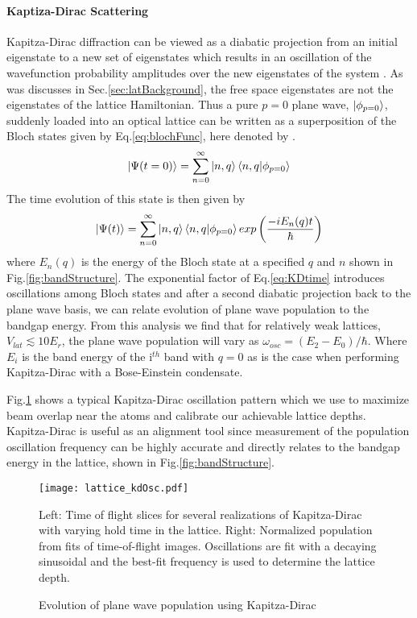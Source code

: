 \paragraph{Kaptiza-Dirac Scattering}
Kapitza-Dirac diffraction can be viewed as a diabatic projection from an initial eigenstate to a new set of eigenstates which results in an oscillation of the wavefunction probability amplitudes over the new eigenstates of the system \cite{Denschlag2002}.
As was discusses in Sec.\;\ref{sec:latBackground}, the free space eigenstates are not the eigenstates of the lattice Hamiltonian. 
Thus a pure $p=0$ plane wave, $\left| {\phi_{p=0}} \right>$, suddenly loaded into an optical lattice can be written as a superposition of the Bloch states given by Eq.\;\ref{eq:blochFunc}, here denoted by .
	\begin{equation} \label{eq:p0inBloch}
		\left| {\Psi(t=0)} \right> = \sum_{n=0}^{\infty} \left| {n,q} \right> \left< {n,q} | {\phi_{p=0}} \right>
	\end{equation}
The time evolution of this state is then given by
	\begin{equation} \label{eq:KDtime}
		\left| {\Psi(t)} \right> = \sum_{n=0}^{\infty} \left| {n,q} \right> \left< {n,q} | {\phi_{p=0}} \right> exp \left( \frac{-i E_n(q) t}{\hbar} \right)
	\end{equation}
where $E_n(q)$ is the energy of the Bloch state at a specified $q$ and $n$ shown in Fig.\;\ref{fig:bandStructure}.
The exponential factor of Eq.\;\ref{eq:KDtime} introduces oscillations among Bloch states and after a second diabatic projection back to the plane wave basis, we can relate evolution of plane wave population to the bandgap energy.
From this analysis we find that for relatively weak lattices, $V_{lat} \lesssim 10 E_r$, the plane wave population will vary as $\omega_{osc} = (E_2 - E_0) / \hbar$.
Where $E_i$ is the band energy of the i$^{th}$ band with $q=0$ as is the case when performing Kapitza-Dirac with a Bose-Einstein condensate.

Fig.\;\ref{fig:KDoscillations} shows a typical Kapitza-Dirac oscillation pattern which we use to maximize beam overlap near the atoms and calibrate our achievable lattice depths. 
Kapitza-Dirac is useful as an alignment tool since measurement of the population oscillation frequency can be highly accurate and directly relates to the bandgap energy in the lattice, shown in Fig.\;\ref{fig:bandStructure}. 
	\begin{figure}
		\texttt{[image: lattice\_kdOsc.pdf]}
		\caption{Evolution of plane wave population using Kapitza-Dirac}{Left: Time of flight slices for several realizations of Kapitza-Dirac with varying hold time in the lattice. Right: Normalized population from fits of time-of-flight images. Oscillations are fit with a decaying sinusoidal and the best-fit frequency is used to determine the lattice depth.}
		 \label{fig:KDoscillations}
	\end{figure}
	
